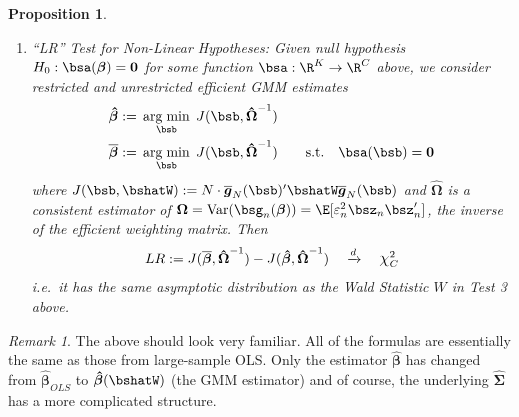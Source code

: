 \documentclass[12pt]{article}
\theoremstyle{plain}
\newtheorem{prop}[thm]{Proposition}
\theoremstyle{definition}
\theoremstyle{remark}
\newtheorem*{rmk}{Remark}
\newcommand*{\Chi}{\mbox{\large$\chi$}} %
\newcommand{\ra}{\rightarrow}
\newcommand{\bsbeta}{\boldsymbol{\beta}}
\newcommand{\bsOmega}{\boldsymbol{\Omega}}
\newcommand{\bshatbeta}{\boldsymbol{\hat{\beta}}}
\newcommand{\bshatSigma}{\boldsymbol{\hat{\Sigma}}}
\newcommand{\bsbarbeta}{\boldsymbol{\overline{\beta}}}
\newcommand{\bshatOmega}{\boldsymbol{\hat{\Omega}}}
\newcommand{\bsbarg}{\boldsymbol{\overline{g}}}
\renewcommand{\bso}{\boldsymbol{0}}
\DeclareMathOperator*{\argmin}{arg\;min}
\newcommand{\Var}{\operatorname{Var}}
\newcommand{\dto}{\xrightarrow{d}}
\begin{document}
\begin{prop}
\begin{enumerate}
  \item \emph{``LR'' Test for Non-Linear Hypotheses}:
    Given null hypothesis $H_0: \bsa(\bsbeta) = \bso$ for some function
    $\bsa:\R^K\ra \R^C$ above,  we consider restricted and unrestricted
    efficient GMM estimates
    \begin{align}
      \bshatbeta
      :=&\; \argmin_{\bsb}\; J(\bsb, \bshatOmega^{-1})
      \label{gmm:lrunrestricted}\\
      \bsbarbeta
      :=&\; \argmin_{\bsb}\; J(\bsb, \bshatOmega^{-1})
      \qquad\text{s.t.} \quad \bsa(\bsb) = \bso
      \label{gmm:lrrestricted}
    \end{align}
    where
    $J(\bsb, \bshatW) := N\cdot \bsbarg_N(\bsb)' \bshatW \bsbarg_N(\bsb)$
    and $\bshatOmega$ is a consistent estimator of
    $\bsOmega=\Var(\bsg_n(\bsbeta))=\E[\varepsilon_n^2\bsz_n\bsz_n']$,
    the inverse of the efficient weighting matrix. Then
    \begin{align*}
      LR :=
      J(\bsbarbeta, \bshatOmega^{-1})
      - J(\bshatbeta, \bshatOmega^{-1})
      \quad \dto \quad \Chi^2_C
    \end{align*}
    i.e.\ it has the same asymptotic distribution as the Wald Statistic
    $W$ in Test 3 above.
\end{enumerate}
\end{prop}

\begin{rmk}
The above should look very familiar. All of the formulas are essentially
the same as those from large-sample OLS. Only the estimator $\bshatbeta$
has changed from $\bshatbeta_{OLS}$ to $\bshatbeta(\bshatW)$ (the GMM
estimator) and of course, the underlying $\bshatSigma$ has a more
complicated structure.
\end{rmk}
\end{document}
